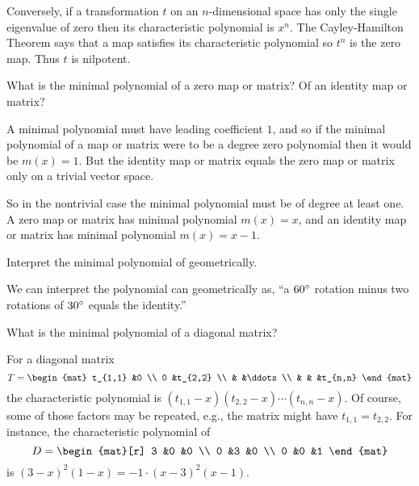 \begin{exercises}
\begin{answer}
       Conversely, if a transformation \( t \) on an
       \( n \)-dimensional space has only the single eigenvalue of zero 
       then its characteristic polynomial is \( x^n \). 
       The Cayley-Hamilton Theorem says that a map satisfies its
       characteristic polynomial so \( t^n \) is the zero map.
       Thus $t$ is nilpotent.
     \end{answer}
   \item 
       What is the minimal polynomial of a zero map or matrix?
       Of an identity map or matrix?
       \begin{answer}
         A minimal polynomial must have leading coefficient $1$, 
         and so if the minimal polynomial of a map or matrix were to 
         be a degree zero polynomial then it would be $m(x)=1$.
         But the identity map or matrix equals the zero map or matrix
         only on a trivial vector space.

         So in the nontrivial case the minimal polynomial must be of degree
         at least one.
         A zero map or matrix has minimal polynomial \( m(x)=x \), and an
         identity map or matrix has minimal polynomial \( m(x)=x-1 \). 
       \end{answer}
  \recommended \item 
     Interpret the minimal polynomial of 
      geometrically.
     \begin{answer}
       We can interpret the polynomial can geometrically as, ``a \( 60^\circ\relax \)
       rotation minus two rotations of \( 30^\circ\relax \) equals the
       identity.''
     \end{answer}
   \item 
     What is the minimal polynomial of a diagonal matrix?
     \begin{answer}
       For a diagonal matrix
       \begin{equation*}
          T=
          \begin{mat}
             t_{1,1}   &0        \\
             0         &t_{2,2}  \\
                       &        &\ddots  \\
                       &        &      &t_{n,n}
          \end{mat}
       \end{equation*}
       the characteristic polynomial is 
       $(t_{1,1}-x)(t_{2,2}-x)\cdots (t_{n,n}-x)$.     
       Of course, some of those factors may be repeated, e.g., the matrix might
       have $t_{1,1}=t_{2,2}$.
       For instance, the characteristic polynomial of
       \begin{equation*}
          D=
          \begin{mat}[r]
             3 &0 &0  \\
             0 &3 &0  \\
             0 &0 &1
          \end{mat}
       \end{equation*}
       is \( (3-x)^2(1-x)=-1\cdot (x-3)^2(x-1) \). 


\end{answer}
\end{exercises}
